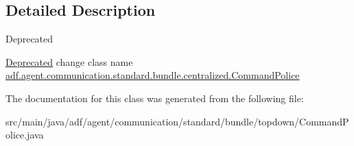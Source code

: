 \subsection{Detailed Description}
\begin{DoxyRefDesc}{Deprecated}
\item[\hyperlink{deprecated__deprecated000003}{Deprecated}]change class name \hyperlink{classadf_1_1agent_1_1communication_1_1standard_1_1bundle_1_1centralized_1_1CommandPolice}{adf.\+agent.\+communication.\+standard.\+bundle.\+centralized.\+Command\+Police} \end{DoxyRefDesc}


The documentation for this class was generated from the following file\+:\begin{DoxyCompactItemize}
\item 
src/main/java/adf/agent/communication/standard/bundle/topdown/Command\+Police.\+java\end{DoxyCompactItemize}
